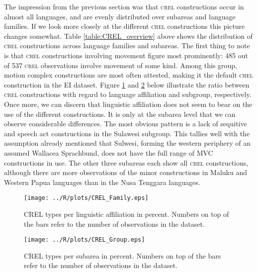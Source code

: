 The impression from the previous section was that \textsc{crel} constructions occur in almost all languages, and are evenly distributed over subareas and language families. If we look more closely at the different \textsc{crel} constructions this picture changes somewhat. Table \ref{table:CREL_overview} above shows the distribution of \textsc{crel} constructions across language families and subareas. The first thing to note is that \textsc{crel} constructions involving movement figure most prominently: 485 out of 537 \textsc{crel} observations involve movement of some kind. Among this group, motion complex constructions are most often attested, making it the default \textsc{crel} construction in the EI dataset. Figure \ref{fig:crel-family} and \ref{fig:crel-group} below illustrate the ratio between \textsc{crel} constructions with regard to language affiliation and subgroup, respectively. Once more, we can discern that linguistic affiliation does not seem to bear on the use of the different constructions. It is only at the subarea level that we can observe considerable differences. The most obvious pattern is a lack of sequitive and speech act constructions in the Sulawesi subgroup. This tallies well with the assumption already mentioned that Sulwesi, forming the western periphery of an assumed Wallacea Sprachbund, does not have the full range of MVC constructions in use. The other three subareas each show all \textsc{crel} constructions, although there are more observations of the minor constructions in Maluku and Western Papua languages than in the Nusa Tenggara languages.

\begin{figure}
\texttt{[image: ../R/plots/CREL\_Family.eps]}
\caption[CREL types per linguistic affiliation in percent]{CREL types per linguistic affiliation in percent. Numbers on top of the bars refer to the number of observations in the dataset.}\label{fig:crel-family}
\end{figure}
\begin{figure}
\texttt{[image: ../R/plots/CREL\_Group.eps]}
\caption[CREL types per subarea in percent]{CREL types per subarea in percent. Numbers on top of the bars refer to the number of observations in the dataset.}\label{fig:crel-group}
\end{figure}


